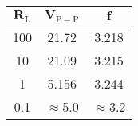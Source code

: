 \begin{tabular}{|c|c|c|}
	\hline
	$\boldsymbol{R_L}$ \tbf{(\si{\kilo\ohm})} &
		$\boldsymbol{V_\mathrm{P-P}}$ \tbf{(\si{\volt})} &
			$\boldsymbol{f}$ \tbf{(\si{\kilo\hertz})} \\ \hline
	100		& 21.72	& 3.218 \\ \hline
	10		& 21.09	& 3.215 \\ \hline
	1		& 5.156	& 3.244 \\ \hline
	0.1		& $\approx$5.0	& $\approx$3.2  \\ \hline
\end{tabular}
